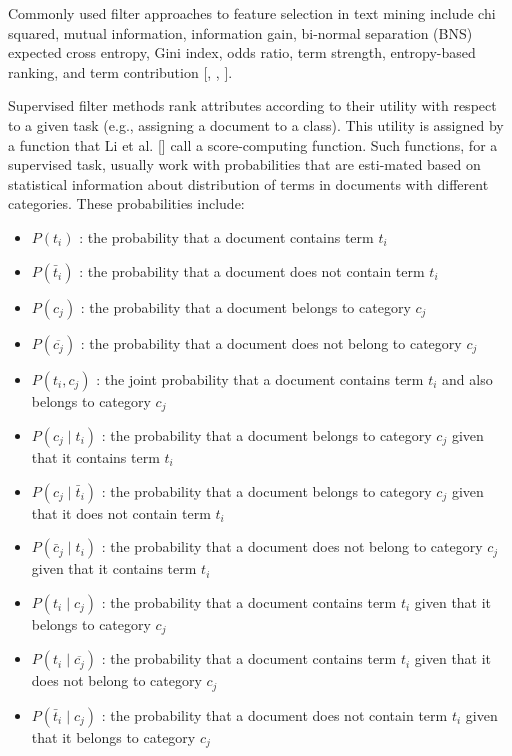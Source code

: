 Commonly used filter approaches to feature selection in text mining include chi squared, mutual information, information gain, bi-normal separation (BNS) expected cross entropy, Gini index, odds ratio, term strength, entropy-based ranking, and term contribution [\cite{ref200}, \cite{ref137}, \cite{ref92}].

Supervised filter methods rank attributes according to their utility with respect to a given task (e.g., assigning a document to a class). This utility is assigned by a function that Li et al. [\cite{ref169}] call a score-computing function. Such functions, for a supervised task, usually work with probabilities that are esti-mated based on statistical information about distribution of terms in documents with different categories. These probabilities include:

\begin{itemize}
  \item $P\left(t_{i}\right)$ : the probability that a document contains term $t_{i}$
  \item $P\left(\bar{t}_{i}\right)$ : the probability that a document does not contain term $t_{i}$
  \item $P\left(c_{j}\right)$ : the probability that a document belongs to category $c_{j}$
  \item $P\left(\overline{c_{j}}\right)$ : the probability that a document does not belong to category $c_{j}$
  \item $P\left(t_{i}, c_{j}\right)$ : the joint probability that a document contains term $t_{i}$ and also belongs to category $c_{j}$
  \item $P\left(c_{j} \mid t_{i}\right)$ : the probability that a document belongs to category $c_{j}$ given that it contains term $t_{i}$
  \item $P\left(c_{j} \mid \bar{t}_{i}\right)$ : the probability that a document belongs to category $c_{j}$ given that it does not contain term $t_{i}$
  \item $P\left(\bar{c}_{j} \mid t_{i}\right)$ : the probability that a document does not belong to category $c_{j}$ given that it contains term $t_{i}$
  \item $P\left(t_{i} \mid c_{j}\right)$ : the probability that a document contains term $t_{i}$ given that it belongs to category $c_{j}$
  \item $P\left(t_{i} \mid \overline{c_{j}}\right)$ : the probability that a document contains term $t_{i}$ given that it does not belong to category $c_{j}$
  \item $P\left(\bar{t}_{i} \mid c_{j}\right)$ : the probability that a document does not contain term $t_{i}$ given that it belongs to category $c_{j}$
\end{itemize}


